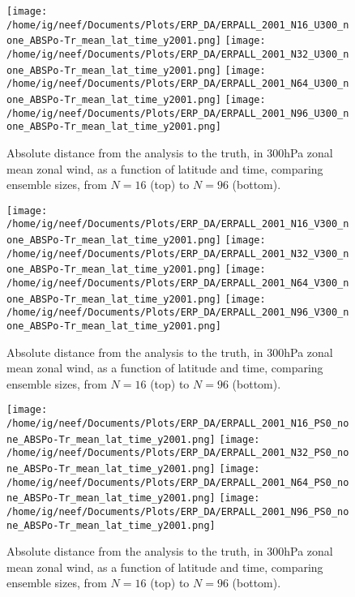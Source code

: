 \documentclass[11pt]{report}
\begin{document}

\begin{figure}
  \noindent
  \texttt{[image: /home/ig/neef/Documents/Plots/ERP\_DA/ERPALL\_2001\_N16\_U300\_none\_ABSPo-Tr\_mean\_lat\_time\_y2001.png]} 
  \texttt{[image: /home/ig/neef/Documents/Plots/ERP\_DA/ERPALL\_2001\_N32\_U300\_none\_ABSPo-Tr\_mean\_lat\_time\_y2001.png]} 
  \texttt{[image: /home/ig/neef/Documents/Plots/ERP\_DA/ERPALL\_2001\_N64\_U300\_none\_ABSPo-Tr\_mean\_lat\_time\_y2001.png]} 
  \texttt{[image: /home/ig/neef/Documents/Plots/ERP\_DA/ERPALL\_2001\_N96\_U300\_none\_ABSPo-Tr\_mean\_lat\_time\_y2001.png]} 
   \caption{Absolute distance from the analysis to the truth, in 300hPa zonal mean zonal wind, as a function of latitude and time, comparing ensemble sizes, from $N=16$ (top) to $N=96$ (bottom). }
   \label{fig:U300_trueinc}
 \end{figure}


\begin{figure}
  \noindent
  \texttt{[image: /home/ig/neef/Documents/Plots/ERP\_DA/ERPALL\_2001\_N16\_V300\_none\_ABSPo-Tr\_mean\_lat\_time\_y2001.png]} 
  \texttt{[image: /home/ig/neef/Documents/Plots/ERP\_DA/ERPALL\_2001\_N32\_V300\_none\_ABSPo-Tr\_mean\_lat\_time\_y2001.png]} 
  \texttt{[image: /home/ig/neef/Documents/Plots/ERP\_DA/ERPALL\_2001\_N64\_V300\_none\_ABSPo-Tr\_mean\_lat\_time\_y2001.png]} 
  \texttt{[image: /home/ig/neef/Documents/Plots/ERP\_DA/ERPALL\_2001\_N96\_V300\_none\_ABSPo-Tr\_mean\_lat\_time\_y2001.png]} 
   \caption{Absolute distance from the analysis to the truth, in 300hPa zonal mean zonal wind, as a function of latitude and time, comparing ensemble sizes, from $N=16$ (top) to $N=96$ (bottom). }
   \label{fig:U300_trueinc}
 \end{figure}



\begin{figure}
  \noindent
  \texttt{[image: /home/ig/neef/Documents/Plots/ERP\_DA/ERPALL\_2001\_N16\_PS0\_none\_ABSPo-Tr\_mean\_lat\_time\_y2001.png]} 
  \texttt{[image: /home/ig/neef/Documents/Plots/ERP\_DA/ERPALL\_2001\_N32\_PS0\_none\_ABSPo-Tr\_mean\_lat\_time\_y2001.png]} 
  \texttt{[image: /home/ig/neef/Documents/Plots/ERP\_DA/ERPALL\_2001\_N64\_PS0\_none\_ABSPo-Tr\_mean\_lat\_time\_y2001.png]} 
  \texttt{[image: /home/ig/neef/Documents/Plots/ERP\_DA/ERPALL\_2001\_N96\_PS0\_none\_ABSPo-Tr\_mean\_lat\_time\_y2001.png]} 
   \caption{Absolute distance from the analysis to the truth, in 300hPa zonal mean zonal wind, as a function of latitude and time, comparing ensemble sizes, from $N=16$ (top) to $N=96$ (bottom). }
   \label{fig:PS0_trueinc}
 \end{figure}
\end{document}
